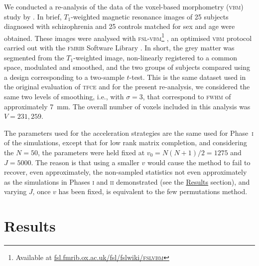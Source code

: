 We conducted a re-analysis of the data of the voxel-based morphometry (\textsc{vbm}) study by \citet{Douaud2007}. In brief, $T_1$-weighted magnetic resonance images of 25 subjects diagnosed with schizophrenia and 25 controls matched for sex and age were obtained. These images were analysed with \textsc{fsl-vbm}\footnote{Available at \href{http://fsl.fmrib.ox.ac.uk/fsl/fslwiki/FSLVBM}{fsl.fmrib.ox.ac.uk/fsl/fslwiki/\textsc{fslvbm}}} \citep{Douaud2007}, an optimised \textsc{vbm} protocol \citep{Good2001} carried out with the \textsc{fmrib} Software Library \citep[\textsc{fsl;}][]{Smith2004}. In short, the grey matter was segmented from the $T_1$-weighted image, non-linearly registered to a common space, modulated and smoothed, and the two groups of subjects compared using a design corresponding to a two-sample $t$-test. This is the same dataset used in the original evaluation of \textsc{tfce} \citep{Smith2009} and for the present re-analysis, we considered the same two levels of smoothing, i.e., with $\sigma=3$, that correspond to \textsc{fwhm} of approximately 7~mm. The overall number of voxels included in this analysis was $V = 231,259$.

The parameters used for the acceleration strategies are the same used for Phase~\textsc{i} of the simulations, except that for low rank matrix completion, and considering the $N=50$, the parameters were held fixed at $v_0=N(N+1)/2=1275$ and $J=5000$. The reason is that using a smaller $v$ would cause the method to fail to recover, even approximately, the non-sampled statistics not even approximately as the simulations in Phases \textsc{i} and \textsc{ii} demonstrated (see the \href{sec:accel:results}{Results} section), and varying $J$, once $v$ has been fixed, is equivalent to the few permutations method.

\section{Results}
\label{sec:accel:results}

